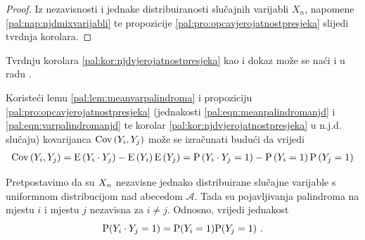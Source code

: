 \begin{proof}
Iz nezavisnosti i jednake distribuiranosti slučajnih varijabli
$X_n$, napomene \ref{pal:nap:njdmixvarijabli} te propozicije
\ref{pal:pro:opcavjerojatnostpresjeka} slijedi tvrdnja korolara.
\end{proof}

\noindent
Tvrdnju korolara \ref{pal:kor:njdvjerojatnostpresjeka}
kao i dokaz 
može se naći i u radu \textcite{leung_nonrandom_2005}. 

\begin{napomena_} \label{pal:nap:kovarijanca}
Koristeći lemu \ref{pal:lem:meanvarpalindroma} i propoziciju \ref{pal:pro:opcavjerojatnostpresjeka}
(jednakosti \ref{pal:eqn:meanpalindromanjd} i \ref{pal:eqn:varpalindromanjd} te korolar \ref{pal:kor:njdvjerojatnostpresjeka} u
n.j.d. slučaju) kovarijanca $\mathrm{Cov}\left(Y_i, Y_j\right)$ može se izračunati budući da vrijedi
\begin{gather}
	\vCov{\tsvar{Y}_i, \tsvar{Y}_j} =
	\vE{\tsvar{Y}_i \cdot \tsvar{Y}_j} - \vE{\tsvar{Y}_i} \vE{\tsvar{Y}_j}
	= \vP \left( \tsvar{Y}_i \cdot \tsvar{Y}_j  =1 \right)
	- \vP \left( \tsvar{Y}_i =1 \right) \vP \left( \tsvar{Y}_j  =1\right)
\end{gather}
\end{napomena_}

\begin{kor}
	Pretpostavimo da su $\tsvar{X}_n$ nezavisne jednako distribuirane slučajne
	varijable s uniformnom distribucijom nad abecedom $\mathcal{A}$.
	Tada su pojavljivanja palindroma na mjestu $i$ i mjestu $j$
	nezavisna za $i \neq j$. Odnosno, vrijedi jednakost
	\[
		\vP( \tsvar{Y}_i \cdot \tsvar{Y}_j =1 ) =  
		\vP( \tsvar{Y}_i=1) \vP( \tsvar{Y}_j=1) \ .
	\]
\end{kor}

